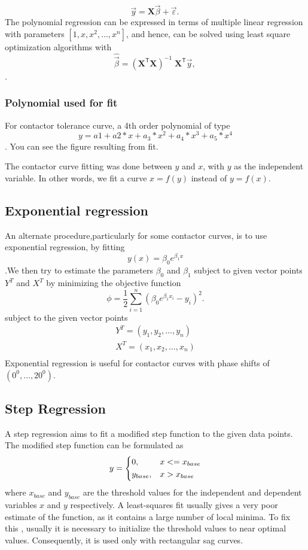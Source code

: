 \documentclass[20pt, a4paper]{report}
\begin{document}
   $$ {\displaystyle {\vec {y}}=\mathbf {X} {\vec {\beta }}+{\vec {\varepsilon }}.\,} $$
   The polynomial regression can be expressed in terms of multiple linear regression with parameters $[1, x, x^{2}, \ldots,x^{n}]$, and hence, can be solved using least square optimization algorithms with $${\displaystyle {\widehat {\vec {\beta }}}=(\mathbf {X} ^{\mathsf {T}}\mathbf {X} )^{-1}\;\mathbf {X} ^{\mathsf {T}}{\vec {y}},\,}$$.
			\subsubsection{Polynomial used for fit}
			 For contactor tolerance curve, a 4th order polynomial of type $$y = a1 + a2*x + a_{3}*x^2 + a_{4}*x^3 +a_{5}*x^4$$. You can see the figure resulting from fit. 
			\begin{figure}[h]
				\centering
			\end{figure}						
			The contactor curve fitting was done between $y$ and $x$, with $y$ as the independent variable. In other words, we fit a curve $x = f(y)$ instead of $ y = f(x) $.
		
		\subsection{Exponential regression}
		
		An alternate procedure,particularly for some contactor curves, is to use exponential regression, by fitting 
		$$ y(x) = \beta_{0}e^{\beta_{1}x}$$.We then try to estimate the parameters $\beta_{0}$ and $\beta_{1}$ subject to given vector points $Y^{T}$ and $X^{T}$ by minimizing the objective function $$ \phi = \frac{1}{2}\sum_{i=1}^{n}(\beta_{0}e^{\beta_{1}x_{i}}-y_{i})^{2}.$$ subject to the given vector points 
		\begin{align*}
		Y^{T} = (y_{1},y_{2},\ldots,y_{n})\\
		X^{T} = (x_{1},x_{2},\ldots,x_{n})\\
	\end{align*}	  	
		Exponential regression is useful for contactor curves with phase shifts of $(0^{0},\ldots,20^{0})$.
		
		\subsection{Step Regression}
		A step regression aims to fit a modified step function to the given data points. The modified step function can be formulated as \begin{align*}
		y = \begin{dcases}
					0,& x<=x_{base}\\
					y_{base},& x>x_{base}
				\end{dcases}
\end{align*}	
	where $x_{base}$ and $y_{base}$ are the threshold values for the independent and dependent variables $x$ and $y$ respectively. 
	 A least-squares fit usually gives a very poor estimate of the function, as it contains a large number of local minima. To fix this , usually it is necessary to initialize the threshold values to near optimal values. 
	 Consequently, it is used only with rectangular sag curves. 	 
		
\end{document}
